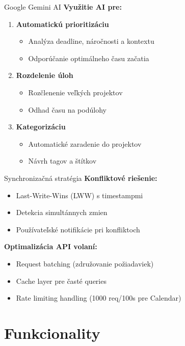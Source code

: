 \documentclass{beamer}
\begin{document}
\begin{frame}{Google Gemini AI}
\textbf{Využitie AI pre:}
\begin{enumerate}
\item \textbf{Automatickú prioritizáciu}
  \begin{itemize}
  \item Analýza deadline, náročnosti a kontextu
  \item Odporúčanie optimálneho času začatia
  \end{itemize}
\item \textbf{Rozdelenie úloh}
  \begin{itemize}
  \item Rozčlenenie veľkých projektov
  \item Odhad času na podúlohy
  \end{itemize}
\item \textbf{Kategorizáciu}
  \begin{itemize}
  \item Automatické zaradenie do projektov
  \item Návrh tagov a štítkov
  \end{itemize}
\end{enumerate}
\end{frame}

\begin{frame}{Synchronizačná stratégia}
\textbf{Konfliktové riešenie:}
\begin{itemize}
\item Last-Write-Wins (LWW) s timestampmi
\item Detekcia simultánnych zmien
\item Používateľské notifikácie pri konfliktoch
\end{itemize}

\vspace{0.5cm}
\textbf{Optimalizácia API volaní:}
\begin{itemize}
\item Request batching (združovanie požiadaviek)
\item Cache layer pre časté queries
\item Rate limiting handling (1000 req/100s pre Calendar)
\end{itemize}
\end{frame}

\section{Funkcionality}
\end{document}
